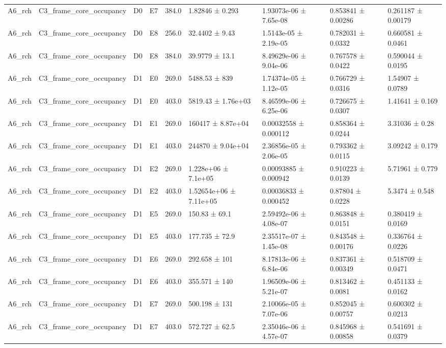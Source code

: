 \begin{table}
\begin{tabular}{lllllllll}
A6\_rch & C3\_frame\_core\_occupancy & D0 & E7 & 384.0 & 1.82846 ± 0.293 & 1.93073e-06 ± 7.65e-08 & 0.853841 ± 0.00286 & 0.261187 ± 0.00179 \\
A6\_rch & C3\_frame\_core\_occupancy & D0 & E8 & 256.0 & 32.4402 ± 9.43 & 1.5143e-05 ± 2.19e-05 & 0.782031 ± 0.0332 & 0.660581 ± 0.0461 \\
A6\_rch & C3\_frame\_core\_occupancy & D0 & E8 & 384.0 & 39.9779 ± 13.1 & 8.49629e-06 ± 9.04e-06 & 0.767578 ± 0.0422 & 0.590044 ± 0.0195 \\
A6\_rch & C3\_frame\_core\_occupancy & D1 & E0 & 269.0 & 5488.53 ± 839 & 1.74374e-05 ± 1.12e-05 & 0.766729 ± 0.0316 & 1.54907 ± 0.0789 \\
A6\_rch & C3\_frame\_core\_occupancy & D1 & E0 & 403.0 & 5819.43 ± 1.76e+03 & 8.46599e-06 ± 6.25e-06 & 0.726675 ± 0.0307 & 1.41641 ± 0.169 \\
A6\_rch & C3\_frame\_core\_occupancy & D1 & E1 & 269.0 & 160417 ± 8.87e+04 & 0.00032558 ± 0.000112 & 0.858364 ± 0.0244 & 3.31036 ± 0.28 \\
A6\_rch & C3\_frame\_core\_occupancy & D1 & E1 & 403.0 & 244870 ± 9.04e+04 & 2.36856e-05 ± 2.06e-05 & 0.793362 ± 0.0115 & 3.09242 ± 0.179 \\
A6\_rch & C3\_frame\_core\_occupancy & D1 & E2 & 269.0 & 1.228e+06 ± 7.1e+05 & 0.00093885 ± 0.000942 & 0.910223 ± 0.0139 & 5.71961 ± 0.779 \\
A6\_rch & C3\_frame\_core\_occupancy & D1 & E2 & 403.0 & 1.52654e+06 ± 7.11e+05 & 0.00036833 ± 0.000452 & 0.87804 ± 0.0228 & 5.3474 ± 0.548 \\
A6\_rch & C3\_frame\_core\_occupancy & D1 & E5 & 269.0 & 150.83 ± 69.1 & 2.59492e-06 ± 4.08e-07 & 0.863848 ± 0.0151 & 0.380419 ± 0.0169 \\
A6\_rch & C3\_frame\_core\_occupancy & D1 & E5 & 403.0 & 177.735 ± 72.9 & 2.35517e-07 ± 1.45e-08 & 0.843548 ± 0.00176 & 0.336764 ± 0.0226 \\
A6\_rch & C3\_frame\_core\_occupancy & D1 & E6 & 269.0 & 292.658 ± 101 & 8.17813e-06 ± 6.84e-06 & 0.837361 ± 0.00349 & 0.518709 ± 0.0471 \\
A6\_rch & C3\_frame\_core\_occupancy & D1 & E6 & 403.0 & 355.571 ± 140 & 1.96509e-06 ± 5.21e-07 & 0.813462 ± 0.0081 & 0.451133 ± 0.0162 \\
A6\_rch & C3\_frame\_core\_occupancy & D1 & E7 & 269.0 & 500.198 ± 131 & 2.10066e-05 ± 7.07e-06 & 0.852045 ± 0.00757 & 0.600302 ± 0.0213 \\
A6\_rch & C3\_frame\_core\_occupancy & D1 & E7 & 403.0 & 572.727 ± 62.5 & 2.35046e-06 ± 4.57e-07 & 0.845968 ± 0.00858 & 0.541691 ± 0.0379 \\

\end{tabular}
\end{table}

